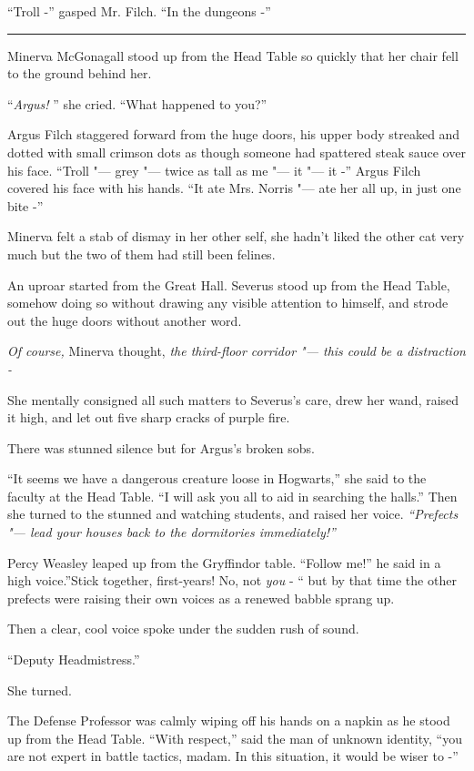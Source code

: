 ``Troll -'' gasped Mr. Filch. ``In the dungeons -''

\begin{center}\rule{3in}{0.4pt}\end{center}

Minerva McGonagall stood up from the Head Table so quickly that her
chair fell to the ground behind her.

``\emph{Argus!} '' she cried. ``What happened to you?''

Argus Filch staggered forward from the huge doors, his upper body
streaked and dotted with small crimson dots as though someone had
spattered steak sauce over his face. ``Troll "--- grey "--- twice as tall as
me "--- it "--- it -'' Argus Filch covered his face with his hands. ``It ate
Mrs. Norris "--- ate her all up, in just one bite -''

Minerva felt a stab of dismay in her other self, she hadn't liked the
other cat very much but the two of them had still been felines.

An uproar started from the Great Hall. Severus stood up from the Head
Table, somehow doing so without drawing any visible attention to
himself, and strode out the huge doors without another word.

\emph{Of course,} Minerva thought, \emph{the third-floor corridor "--- this
could be a distraction -}

She mentally consigned all such matters to Severus's care, drew her
wand, raised it high, and let out five sharp cracks of purple fire.

There was stunned silence but for Argus's broken sobs.

``It seems we have a dangerous creature loose in Hogwarts,'' she said to
the faculty at the Head Table. ``I will ask you all to aid in searching
the halls.'' Then she turned to the stunned and watching students, and
raised her voice. \emph{``Prefects "--- lead your houses back to the
dormitories immediately!''}

Percy Weasley leaped up from the Gryffindor table. ``Follow me!'' he
said in a high voice.''Stick together, first-years! No, not \emph{you} -
`` but by that time the other prefects were raising their own voices as a
renewed babble sprang up.

Then a clear, cool voice spoke under the sudden rush of sound.

``Deputy Headmistress.''

She turned.

The Defense Professor was calmly wiping off his hands on a napkin as he
stood up from the Head Table. ``With respect,'' said the man of unknown
identity, ``you are not expert in battle tactics, madam. In this
situation, it would be wiser to -''

